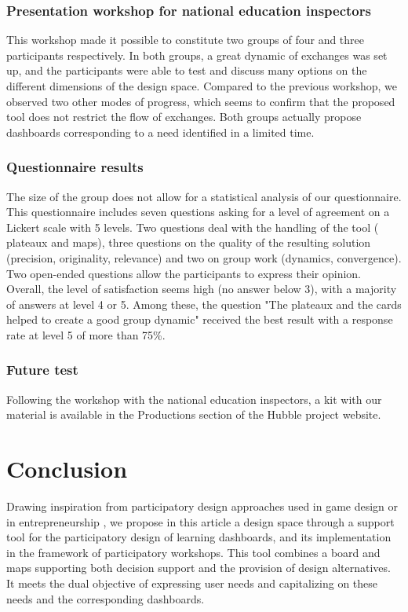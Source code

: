 \documentclass[manuscript,screen,nonacm,12pt]{acmart}
\begin{document}
\subsubsection{Presentation workshop for national education inspectors}
This workshop made it possible to constitute two groups of four and three participants respectively. In both groups, a great dynamic of exchanges was set up, and the participants were able to test and discuss many options on the different dimensions of the design space. Compared to the previous workshop, we observed two other modes of progress, which seems to confirm that the proposed tool does not restrict the flow of exchanges. Both groups actually propose dashboards corresponding to a need identified in a limited time. 

\subsubsection{Questionnaire results}
The size of the group does not allow for a statistical analysis of our questionnaire. This questionnaire includes seven questions asking for a level of agreement on a Lickert scale with 5 levels. Two questions deal with the handling of the tool ( plateaux and maps), three questions on the quality of the resulting solution (precision, originality, relevance) and two on group work (dynamics, convergence). Two open-ended questions allow the participants to express their opinion. Overall, the level of satisfaction seems high (no answer below 3), with a majority of answers at level 4 or 5. Among these, the question "The plateaux and the cards helped to create a good group dynamic" received the best result with a response rate at level 5 of more than 75\%.

\subsubsection{Future test}
Following the workshop with the national education inspectors, a kit with our material is  available in the Productions section of the Hubble project website.


\section{Conclusion}
Drawing inspiration from participatory design approaches used in game design \cite{hallifax2018design} or in entrepreneurship \cite{osterwalder2010business}, we propose in this article a design space through a support tool for the participatory design of learning dashboards, and its implementation in the framework of participatory workshops. This tool combines a board and maps supporting both decision support and the provision of design alternatives. It meets the dual objective of expressing user needs and capitalizing on these needs and the corresponding dashboards. 
\end{document}
